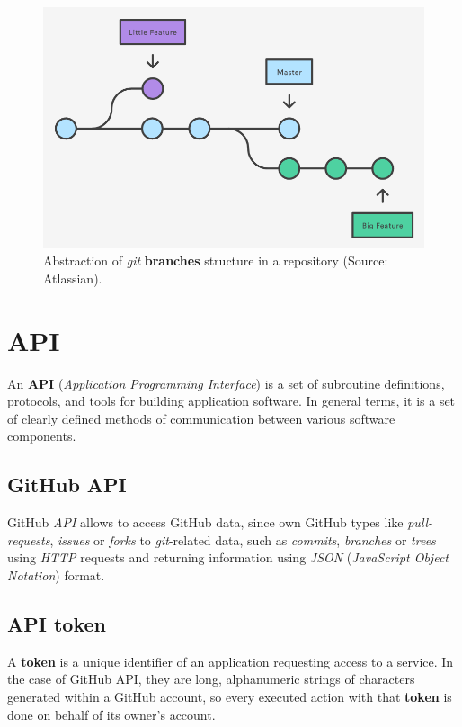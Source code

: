 \documentclass[a4paper, 12pt]{book}
\begin{document}
\begin{figure}
  \centering
  \includegraphics[width=12cm, keepaspectratio]{img/branches-example-atlassian}
  \caption{Abstraction of \emph{git} \textbf{branches} structure in a repository (Source: Atlassian).}
  \label{fig:git-branches-example}
\end{figure}
\section{API}
\label{sec:api}
An \textbf{API} (\textit{Application Programming Interface}) is a set of subroutine definitions, protocols, and tools for building
application software. In general terms, it is a set of clearly defined methods of communication between various software components.
\subsection{GitHub API}
\label{ssec:sec_gh-api}
GitHub \textit{API} allows to access GitHub data, since own GitHub types like \textit{pull-requests}, \textit{issues} or \textit{forks}
to \emph{git}-related data, such as \textit{commits}, \textit{branches} or \textit{trees} using \textit{HTTP} requests and
returning information using \emph{JSON} (\textit{JavaScript Object Notation}) format.
\subsection{API token}
\label{ssec:api-token}
A \textbf{token} is a unique identifier of an application requesting access to a service.
In the case of GitHub API, they are long, alphanumeric strings of characters generated within a GitHub account,
so every executed action with that \textbf{token} is done on behalf of its owner's account.
\end{document}
